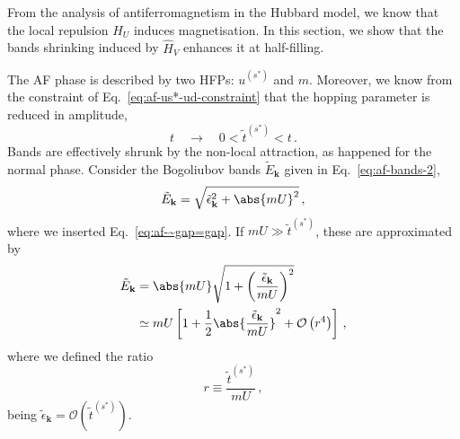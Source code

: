 From the analysis of antiferromagnetism in the Hubbard model, we know that the local repulsion $\hat H_U$ induces magnetisation. In this section, we show that the bands shrinking induced by $\hat H_V$ enhances it at half-filling.

The AF phase is described by two HFPs: $u^{(s^*)}$ and $m$. Moreover, we know from the constraint of Eq.~\eqref{eq:af-us*-ud-constraint} that the hopping parameter is reduced in amplitude,
\[
	t
	\quad\to\quad
	0 < \tilde{t}^{(s^*)} < t \, .
\]
Bands are effectively shrunk by the non-local attraction, as happened for the normal phase.  Consider the Bogoliubov bands $\tilde{E}_\mathbf{k}$ given in Eq.~\eqref{eq:af-bands-2},
\[
\tilde{E}_\mathbf{k} = \sqrt{
	\tilde{\epsilon}_\mathbf{k}^2 + \abs{mU}^2
} \, ,
\]
where we inserted Eq.~\eqref{eq:af-~gap=gap}. If $mU \gg \tilde{t}^{(s^*)}$, these are approximated by
\begin{align}
	\tilde{E}_\mathbf{k} &= \abs{mU} \sqrt{
		1 + \left( \frac{\tilde{\epsilon}_\mathbf{k}}{mU} \right)^2
	} \nonumber \\
	&\simeq mU \left[
	1 + \frac{1}{2} \abs{\frac{\tilde{\epsilon}_\mathbf{k}}{mU}}^2 + \mathcal{O} \left(r^4\right)
	\right] \label{eq:af-Ek-approx} \, ,
\end{align}
where we defined the ratio
\begin{equation}\label{eq:af-mott-m-r}
	r \equiv \frac{\tilde{t}^{(s^*)}}{mU} \, ,
\end{equation}
being $\tilde{\epsilon}_\mathbf{k} = \mathcal{O}\left(\tilde{t}^{(s^*)}\right)$.

